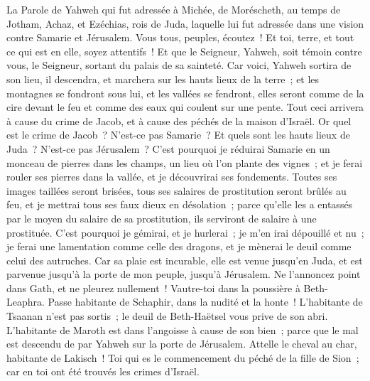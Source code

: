 \begin{multicols}{2}
\VerseOne{}La Parole de Yahweh qui fut adressée à Michée, de Moréscheth, au temps de Jotham, Achaz, et Ezéchias, rois de Juda, laquelle lui fut adressée dans une vision contre Samarie et Jérusalem.
Vous tous, peuples, écoutez~! Et toi, terre, et tout ce qui est en elle, soyez attentifs~! Et que le Seigneur, Yahweh, soit témoin contre vous, le Seigneur, sortant du palais de sa sainteté.
Car voici, Yahweh sortira de son lieu, il descendra, et marchera sur les hauts lieux de la terre~;
et les montagnes se fondront sous lui, et les vallées se fendront, elles seront comme de la cire devant le feu et comme des eaux qui coulent sur une pente.
Tout ceci arrivera à cause du crime de Jacob, et à cause des péchés de la maison d'Israël. Or quel est le crime de Jacob~? N'est-ce pas Samarie~? Et quels sont les hauts lieux de Juda~? N'est-ce pas Jérusalem~?
C'est pourquoi je réduirai Samarie en un monceau de pierres dans les champs, un lieu où l'on plante des vignes~; et je ferai rouler ses pierres dans la vallée, et je découvrirai ses fondements.
Toutes ses images taillées seront brisées, tous ses salaires de prostitution seront brûlés au feu, et je mettrai tous ses faux dieux en désolation~; parce qu'elle les a entassés par le moyen du salaire de sa prostitution, ils serviront de salaire à une prostituée.
C'est pourquoi je gémirai, et je hurlerai~; je m'en irai dépouillé et nu~; je ferai une lamentation comme celle des dragons, et je mènerai le deuil comme celui des autruches.
Car sa plaie est incurable, elle est venue jusqu'en Juda, et est parvenue jusqu'à la porte de mon peuple, jusqu'à Jérusalem.
Ne l'annoncez point dans Gath, et ne pleurez nullement~! Vautre-toi dans la poussière à Beth-Leaphra.
Passe habitante de Schaphir, dans la nudité et la honte~! L'habitante de Tsaanan n'est pas sortis~; le deuil de Beth-Haëtsel vous prive de son abri.
L'habitante de Maroth est dans l'angoisse à cause de son bien~; parce que le mal est descendu de par Yahweh sur la porte de Jérusalem.
Attelle le cheval au char, habitante de Lakisch~! Toi qui es le commencement du péché de la fille de Sion~; car en toi ont été trouvés les crimes d'Israël.

\end{multicols}
